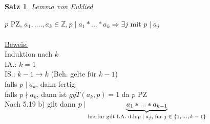 \documentclass[a4paper,11pt]{article}
\newtheorem{satz}[definition]{Satz}
\begin{document}
\begin{satz}
	Lemma von Euklied
\end{satz}
$p$ PZ, $a_1,....,a_k\in\mathbb{Z},p\mid a_1*...*a_k\Rightarrow\exists j$ mit $p\mid a_j$ \\
\\
\underline{Beweis:} \\
Induktion nach $k$ \\
IA.: $k=1$ \\
IS.: $k-1\rightarrow k$ (Beh. gelte für $k-1$) \\
falls $p\mid a_k$, dann fertig \\
falls $p\nmid a_k$, dann ist $ggT(a_k,p)=1$ da $p$ PZ \\
Nach 5.19 b) gilt dann $p\mid \underbrace{a_1*...*a_{k-1}}_{\text{hierfür gilt I.A. d.h. \\ $p\mid a_j$, für $j\in\{1,...,k-1\}$}}$
\end{document}
